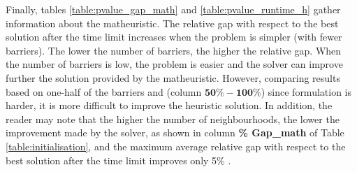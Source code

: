 \documentclass[a4paper,  review, authoryear, 1p.]{elsarticle}
\newcommand{\KMPHN}{{\sf{H-KMPHN}}}
\newcommand{\KMPN}{{\sf{H-KMPN}\xspace }}
\begin{document}
		
			
		
		Finally, tables \ref{table:pvalue_gap_math} and \ref{table:pvalue_runtime_h} gather information about the matheuristic.  The relative gap with respect to the best solution after the time limit increases when the problem is simpler (with fewer barriers). The lower the number of barriers, the higher the relative gap. When the number of barriers is low, the problem is easier and the solver can improve further the solution provided by the matheuristic. 	However, comparing results based on one-half of the barriers and \KMPHN\xspace  (column $\bm{50\%-100\%}$) since \KMPN \xspace formulation is harder, it is more difficult to improve the heuristic solution. In addition, the reader may note that the higher the number of neighbourhoods, the lower the improvement made by the solver, as shown in column \textbf{\% Gap\_math} of Table \ref{table:initialisation}, and the maximum average relative gap with respect to the best solution after the time limit improves only 5\% . 
\end{document}
